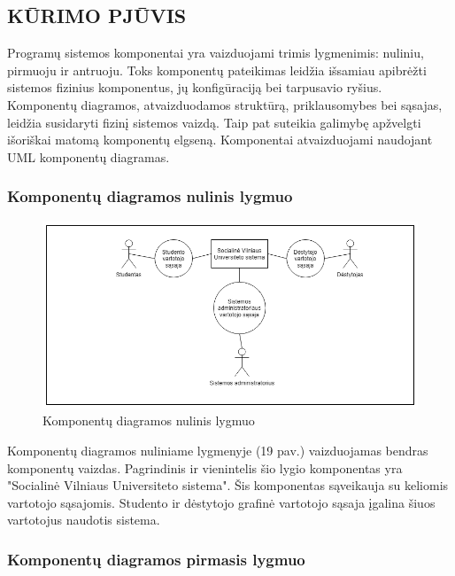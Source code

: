 \documentclass{VUMIFPSkursinis}
\begin{document}
	\subsection{KŪRIMO PJŪVIS}
	Programų sistemos komponentai yra vaizduojami trimis lygmenimis: nuliniu, pirmuoju ir antruoju. Toks komponentų pateikimas leidžia išsamiau apibrėžti sistemos fizinius komponentus, jų konfigūraciją bei tarpusavio ryšius. Komponentų diagramos, atvaizduodamos struktūrą, priklausomybes bei sąsajas, leidžia susidaryti fizinį sistemos vaizdą. Taip pat suteikia galimybę apžvelgti išoriškai matomą komponentų elgseną. Komponentai atvaizduojami naudojant UML komponentų diagramas.
	
	\subsubsection{Komponentų diagramos nulinis lygmuo}
	
	\begin{figure}[H]
		\centering
		\includegraphics[width=\linewidth]{img/0lygmuo.png}
		\caption{Komponentų diagramos nulinis lygmuo}
		\label{fig:0lygmuo}
	\end{figure}
	
	Komponentų diagramos nuliniame lygmenyje (19 pav.) vaizduojamas bendras komponentų vaizdas. Pagrindinis ir vienintelis šio lygio komponentas yra "Socialinė Vilniaus Universiteto sistema". Šis komponentas sąveikauja su keliomis vartotojo sąsajomis. Studento ir dėstytojo grafinė vartotojo sąsaja įgalina šiuos vartotojus naudotis sistema.
	
	\subsubsection{Komponentų diagramos pirmasis lygmuo}
	
\end{document}
